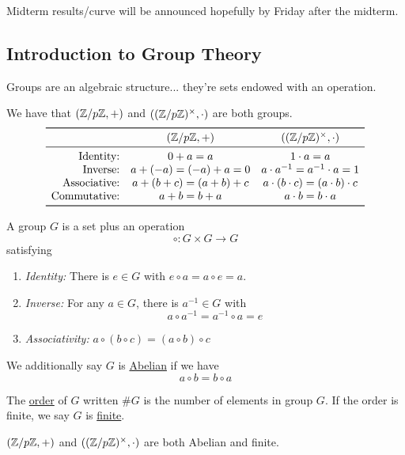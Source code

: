 Midterm results/curve will be announced hopefully by Friday after the midterm.

\subsection{Introduction to Group Theory}
Groups are an algebraic structure... they're sets endowed with an operation.
\begin{example}
    We have that $(\mathbb Z/p\mathbb Z, +)$ and $((\mathbb Z/p\mathbb Z)^\times, \cdot)$ are both groups.
    \[\begin{array}{rcc}
            \toprule
                                & (\ZZ/p\ZZ, +)           & ((\ZZ/p\ZZ)^\times, \cdot )           \\ \midrule
            \text{Identity:}    & 0+a=a                   & 1\cdot a = a                          \\
            \text{Inverse:}     & a + (-a) = (-a) + a = 0 & a\cdot a^{-1} = a^{-1}\cdot a = 1     \\
            \text{Associative:} & a + (b + c) = (a+b)+c   & a\cdot (b\cdot c) = (a\cdot b)\cdot c \\
            \text{Commutative:} & a + b = b + a           & a\cdot b = b\cdot a                   \\ \bottomrule
        \end{array}\]
\end{example}
\begin{definition}[Group]
    A group $G$ is a set plus an operation
    \[\circ : G\times G \to G\]
    satisfying
    \begin{enumerate}
        \item \emph{Identity:} There is $e\in G$ with $e\circ a = a\circ e = a$.
        \item \emph{Inverse:} For any $a\in G$, there is $a^{-1}\in G$ with
              \[a\circ a^{-1} = a^{-1}\circ a = e\]
        \item \emph{Associativity:} $a\circ (b\circ c)=(a\circ b)\circ c$
    \end{enumerate}
    We additionally say $G$ is \ul{Abelian} if we have
    \[a\circ b = b\circ a\]
\end{definition}

\begin{definition}
    The \ul{order} of $G$ written $\#G$ is the number of elements in group $G$. If the order is finite, we say $G$ is \ul{finite}.
\end{definition}
\begin{example}
    $(\mathbb Z/p\mathbb Z, +)$ and $((\mathbb Z/p\mathbb Z)^\times, \cdot)$ are both Abelian and finite.
\end{example}